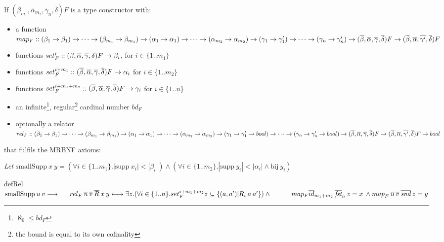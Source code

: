 \begin{definition}[\ac{MRBNF}]
If $(\overline{\beta}_{m_1}, \overline{\alpha}_{m_2}, \overline{\gamma}_n, \overline{\delta}) F$ is a type constructor with:
\begin{itemize}
\item{a function $map_F :: (\beta_1 \to \beta_1) \to \dots \to (\beta_{m_1} \to \beta_{m_1}) \to (\alpha_1 \to \alpha_1) \to \dots \to (\alpha_{m_2} \to \alpha_{m_2}) \to (\gamma_1 \to \gamma'_1) \to \dots \to (\gamma_n \to \gamma'_n) \to (\overline{\beta}, \overline{\alpha}, \overline{\gamma}, \overline{\delta}) F \to (\overline{\beta}, \overline{\alpha}, \overline{\gamma'}, \overline{\delta}) F$}
\item{functions $set_F^i :: (\overline{\beta}, \overline{\alpha}, \overline{\gamma}, \overline{\delta}) F \to \beta_i$, for $i \in \{1 .. m_1\}$}
\item{functions $set_F^{i+m_1} :: (\overline{\beta}, \overline{\alpha}, \overline{\gamma}, \overline{\delta}) F \to \alpha_i$ for $i \in \{1 .. m_2\}$}
\item{functions $set_F^{i+m_1+m_2} :: (\overline{\beta}, \overline{\alpha}, \overline{\gamma}, \overline{\delta}) F \to \gamma_i$ for $i \in \{1 .. n\}$}
\item{an infinite\footnote{$\aleph_0 \le bd_F$}, regular\footnote{the bound is equal to its own cofinality\label{ftn:regular}} cardinal number $bd_F$}
\item{optionally a relator $rel_F :: (\beta_1 \to \beta_1) \to \dots \to (\beta_{m_1} \to \beta_{m_1}) \to (\alpha_1 \to \alpha_1) \to \dots \to (\alpha_{m_2} \to \alpha_{m_2}) \to (\gamma_1 \to \gamma'_1 \to bool) \to \dots \to (\gamma_n \to \gamma'_n \to bool) \to (\overline{\beta}, \overline{\alpha}, \overline{\gamma}, \overline{\delta}) F \to (\overline{\beta}, \overline{\alpha}, \overline{\gamma'}, \overline{\delta}) F \to bool$}
\end{itemize}


that fulfils the \ac{MRBNF} axioms:
\vspace{1em}

\textit{Let} $\text{smallSupp} \: x \: y = (\forall i \in \{1..m_1\}. |\text{supp} \: x_i| < |\beta_i|) \wedge (\forall i \in \{1..m_2\}. |\text{supp} \: y_i| < |\alpha_i| \wedge \text{bij} \: y_i)$

\newcommand{\mapF}[3]{\map{F}{#1}{#2}{#3}}
\newcommand{\relF}[3]{rel_F \: \overline{#1} \: \overline{#2} \: \overline{#3}}

\begin{axiom}{defRel}\label{ax:def_rel}
$\smallSupp{u}{v} \longrightarrow \\
\ms \relF{u}{v}{R} \: x \: y \longleftrightarrow \exists z. (\forall i \in \{1..n\}. set_F^{i+m_1+m_2} z \subseteq \{(a, a') | R_i \: a \: a' \}) \wedge \\
\ms \ms map_F \overline{id}_{m_1+m_2} \: \overline{\textit{fst}}_n \: z = x \: \wedge \mapF{u}{v}{\textit{snd}} \: z = y
$
\end{axiom}


\end{definition}
